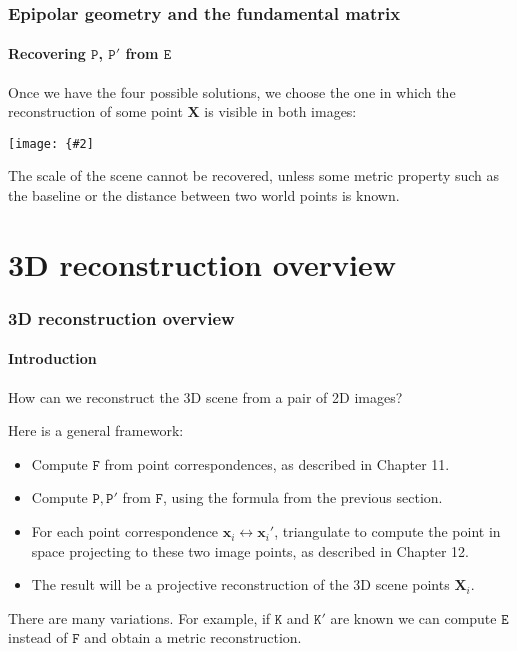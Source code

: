 \documentclass[aspectratio=169]{beamer}
\renewcommand{\vec}[1]{\boldsymbol{#1}}
\newcommand{\mat}[1]{\mathtt{#1}}
\newcommand{\myfig}[3]{\centerline{\texttt{[image: \{\#2]}}}
    \centerline{\scriptsize #3}}
\begin{document}
\begin{frame}
\frametitle{Epipolar geometry and the fundamental matrix}
\framesubtitle{Recovering $\mat{P}$, $\mat{P}'$ from $\mat{E}$}

Once we have the four possible solutions, we choose the one in which
the reconstruction of some point $\vec{X}$ is \alert{visible in both
  images}:

\medskip

\myfig{2.3in}{HZ-fig8-12}{Hartley and Zisserman (2004), Fig.\ 9.12}

\medskip

The scale of the scene cannot be recovered, unless some metric
property such as the baseline or the distance between two world points
is known.

\end{frame}

\section{3D reconstruction overview}

\begin{frame}
\frametitle{3D reconstruction overview}
\framesubtitle{Introduction}

How can we \alert{reconstruct} the 3D scene from a pair of 2D images?

\medskip

Here is a general framework:
\begin{itemize}
\item \alert{Compute $\mat{F}$} from point correspondences, as
  described in Chapter 11.
\item \alert{Compute $\mat{P},\mat{P}'$ from $\mat{F}$}, using the
  formula from the previous section.
\item For each point correspondence $\vec{x}_i \leftrightarrow
  \vec{x}_i'$, \alert{triangulate} to compute the point in space
  projecting to these two image points, as described in Chapter 12.
\item The result will be a \alert{projective} reconstruction of
  the 3D scene points $\vec{X}_i$.
\end{itemize}

\medskip

There are many variations.  For example, if $\mat{K}$ and $\mat{K}'$
are known we can compute $\mat{E}$ instead of $\mat{F}$ and obtain
a \alert{metric} reconstruction.

\end{frame}
\end{document}
